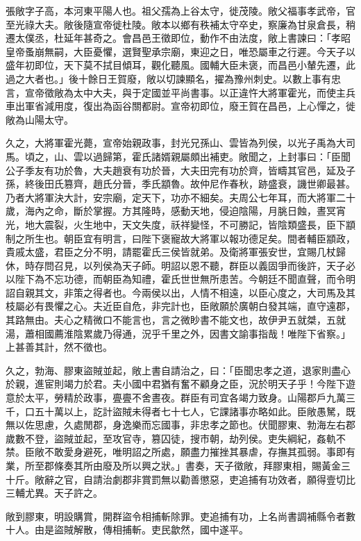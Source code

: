 \begin{pinyinscope}
張敞字子高，本河東平陽人也。祖父孺為上谷太守，徙茂陵。敞父福事孝武帝，官至光祿大夫。敞後隨宣帝徙杜陵。敞本以鄉有秩補太守卒史，察廉為甘泉倉長，稍遷太僕丞，杜延年甚奇之。會昌邑王徵即位，動作不由法度，敞上書諫曰：「孝昭皇帝蚤崩無嗣，大臣憂懼，選賢聖承宗廟，東迎之日，唯恐屬車之行遲。今天子以盛年初即位，天下莫不拭目傾耳，觀化聽風。國輔大臣未褒，而昌邑小輦先遷，此過之大者也。」後十餘日王賀廢，敞以切諫顯名，擢為豫州刺史。以數上事有忠言，宣帝徵敞為太中大夫，與于定國並平尚書事。以正違忤大將軍霍光，而使主兵車出軍省減用度，復出為函谷關都尉。宣帝初即位，廢王賀在昌邑，上心憚之，徙敞為山陽太守。

久之，大將軍霍光薨，宣帝始親政事，封光兄孫山、雲皆為列侯，以光子禹為大司馬。頃之，山、雲以過歸第，霍氏諸婿親屬頗出補吏。敞聞之，上封事曰：「臣聞公子季友有功於魯，大夫趙衰有功於晉，大夫田完有功於齊，皆疇其官邑，延及子孫，終後田氏篡齊，趙氏分晉，季氏顓魯。故仲尼作春秋，跡盛衰，譏世卿最甚。乃者大將軍決大計，安宗廟，定天下，功亦不細矣。夫周公七年耳，而大將軍二十歲，海內之命，斷於掌握。方其隆時，感動天地，侵迫陰陽，月朓日蝕，晝冥宵光，地大震裂，火生地中，天文失度，祅祥變怪，不可勝記，皆陰類盛長，臣下顓制之所生也。朝臣宜有明言，曰陛下褒寵故大將軍以報功德足矣。間者輔臣顓政，貴戚太盛，君臣之分不明，請罷霍氏三侯皆就弟。及衛將軍張安世，宜賜几杖歸休，時存問召見，以列侯為天子師。明詔以恩不聽，群臣以義固爭而後許，天子必以陛下為不忘功德，而朝臣為知禮，霍氏世世無所患苦。今朝廷不聞直聲，而令明詔自親其文，非策之得者也。今兩侯以出，人情不相遠，以臣心度之，大司馬及其枝屬必有畏懼之心。夫近臣自危，非完計也，臣敞願於廣朝白發其端，直守遠郡，其路無由。夫心之精微口不能言也，言之微眇書不能文也，故伊尹五就桀，五就湯，蕭相國薦淮陰累歲乃得通，況乎千里之外，因書文諭事指哉！唯陛下省察。」上甚善其計，然不徵也。

久之，勃海、膠東盜賊並起，敞上書自請治之，曰：「臣聞忠孝之道，退家則盡心於親，進宦則竭力於君。夫小國中君猶有奮不顧身之臣，況於明天子乎！今陛下遊意於太平，勞精於政事，亹亹不舍晝夜。群臣有司宜各竭力致身。山陽郡戶九萬三千，口五十萬以上，訖計盜賊未得者七十七人，它課諸事亦略如此。臣敞愚駑，既無以佐思慮，久處閒郡，身逸樂而忘國事，非忠孝之節也。伏聞膠東、勃海左右郡歲數不登，盜賊並起，至攻官寺，篡囚徒，搜市朝，劫列侯。吏失綱紀，姦軌不禁。臣敞不敢愛身避死，唯明詔之所處，願盡力摧挫其暴虐，存撫其孤弱。事即有業，所至郡條奏其所由廢及所以興之狀。」書奏，天子徵敞，拜膠東相，賜黃金三十斤。敞辭之官，自請治劇郡非賞罰無以勸善懲惡，吏追捕有功效者，願得壹切比三輔尤異。天子許之。

敞到膠東，明設購賞，開群盜令相捕斬除罪。吏追捕有功，上名尚書調補縣令者數十人。由是盜賊解散，傳相捕斬。吏民歙然，國中遂平。


\end{pinyinscope}
